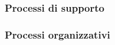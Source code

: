 {{\subsubsection{Processi di supporto}
\begin{comment}
    {\renewcommand{\arraystretch}{1.5}
    \begin{tabularx}{\textwidth}{p{0.18\textwidth}|p{0.6\textwidth}|X}
    \textbf{Obiettivo} & \textbf{Descrizione} & \textbf{Metriche}  \\
    \hline
    Correttezza Risposte &   & \\
    \hline
    Velocità di esecuzione &  &  \\
    \end{tabularx}}
    {\renewcommand{\arraystretch}{1.5}
    \begin{tabularx}{\textwidth}{p{0.18\textwidth}|p{0.6\textwidth}|X}
    \textbf{Obiettivo} & \textbf{Descrizione} & \textbf{Metriche}  \\
    \hline
    Verifica &  &  \\
    \hline
    Gestione della qualità &  &  \\
    \end{tabularx}}

\end{comment}    
\subsubsection{Processi organizzativi}
\begin{comment}
    {\renewcommand{\arraystretch}{1.5}
    \begin{tabularx}{\textwidth}{p{0.18\textwidth}|p{0.6\textwidth}|X}
    \textbf{Obiettivo} & \textbf{Descrizione} & \textbf{Metriche}  \\
    \hline
    Gestione organizzativa &  &  \\
    \end{tabularx}}
    \end{comment}
    


    

\begin{comment}
    {\renewcommand{\arraystretch}{1.5}
    \begin{tabularx}{\textwidth}{p{0.05\textwidth}|p{0.35\textwidth}|X|X}
    \textbf{ID} & \textbf{Nome metrica} & \textbf{Valore accettabile} & \textbf{Valore ottimale}  \\
    \hline
    \multicolumn{4}{l}{\cellcolor{primarycolor}\textbf{\textit{Gestione organizzativa}}} \\
    \hline
     &  &  &  \\
    \end{tabularx}}  
\end{comment}




}}
